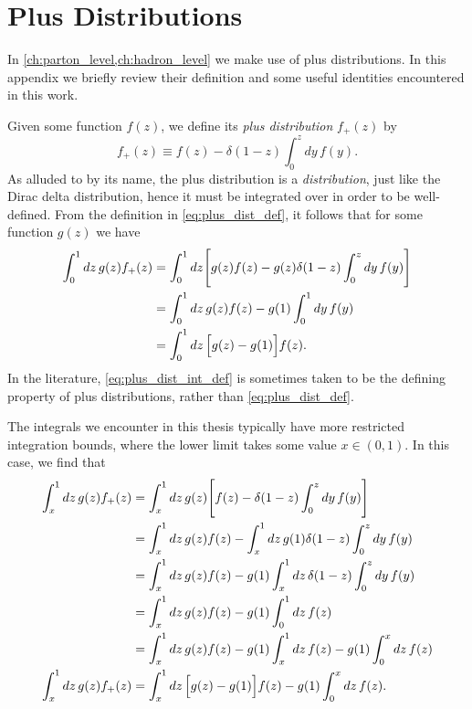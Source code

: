 \chapter{Plus Distributions}\label{app:plus_dist}
In \cref{ch:parton_level,ch:hadron_level} we make use of plus distributions.
In this appendix we briefly review their definition and some useful identities encountered in this work.

Given some function $f(z)$, we define its \emph{plus distribution} $f_+(z)$ by
\begin{equation}\label{eq:plus_dist_def}
    f_+(z) \equiv f(z) - \delta(1-z) \int_0^z dy\, f(y).
\end{equation}
As alluded to by its name, the plus distribution is a \emph{distribution}, just like the Dirac delta distribution, hence it must be integrated over in order to be well-defined.
From the definition in \cref{eq:plus_dist_def}, it follows that for some function $g(z)$ we have
\begin{align}
    \int_0^1 dz\, g(z) f_+(z) &= \int_0^1 dz \Biggl[ g(z) f(z) - g(z) \delta(1-z) \int_0^z dy\, f(y) \Biggr]
    \nonumber \\
    &= \int_0^1 dz \, g(z) f(z) - g(1) \int_0^1 dy \, f(y)
    \nonumber \\
    &= \int_0^1 dz \, \Bigl[ g(z) - g(1) \Bigr] f(z).
    \label{eq:plus_dist_int_def}
\end{align}
In the literature, \cref{eq:plus_dist_int_def} is sometimes taken to be the defining property of plus distributions, rather than \cref{eq:plus_dist_def}.

The integrals we encounter in this thesis typically have more restricted integration bounds, where the lower limit takes some value $x\in(0,1)$.
In this case, we find that
\begin{align}
    \int_x^1 dz \, g(z) f_+(z)
    &= \int_x^1 dz \, g(z) \Biggl[ f(z) - \delta(1-z) \int_0^z dy \, f(y) \Biggr]
    \nonumber \\
    &= \int_x^1 dz \, g(z) f(z)
    - \int_x^1 dz \, g(1) \delta(1-z) \int_0^z dy \, f(y)
    \nonumber \\
    &= \int_x^1 dz \, g(z) f(z)
    - g(1) \int_x^1 dz \, \delta(1-z) \int_0^z dy \, f(y)
    \nonumber \\
    &= \int_x^1 dz \, g(z) f(z)
    - g(1) \int_0^1 dz \, f(z)
    \nonumber \\
    &= \int_x^1 dz \, g(z) f(z)
    - g(1) \int_x^1 dz \, f(z)
    - g(1) \int_0^x dz \, f(z)
    \nonumber \\
    \int_x^1 dz \, g(z) f_+(z) &= \int_x^1 dz \, \Bigl[ g(z)-g(1) \Bigr] f(z)
    - g(1) \int_0^x dz \, f(z).
    \label{eq:plus_dist_int_x_to_1}
\end{align}


